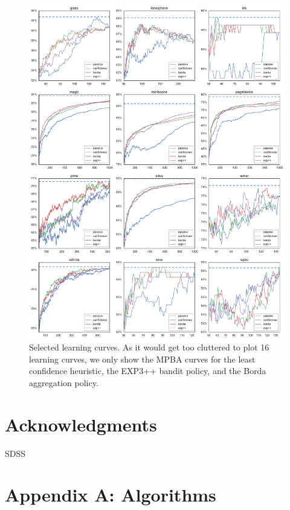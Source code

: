 \documentclass[fleqn,10pt,lineno]{wlpeerj} %
\begin{document}
\begin{figure}[tbp]
	\centering
	\includegraphics[width=\textwidth]{figures/learning_curves}
	\caption[Selected learning curves]{Selected learning curves. As it would get too cluttered to plot 16 learning curves, we only show the MPBA curves for the least confidence heuristic, the EXP3++ bandit policy, and the Borda aggregation policy.}
	\label{fig:learning_curves}
\end{figure}


\section*{Acknowledgments}

SDSS



\pagebreak

\section*{Appendix A: Algorithms}
\end{document}
